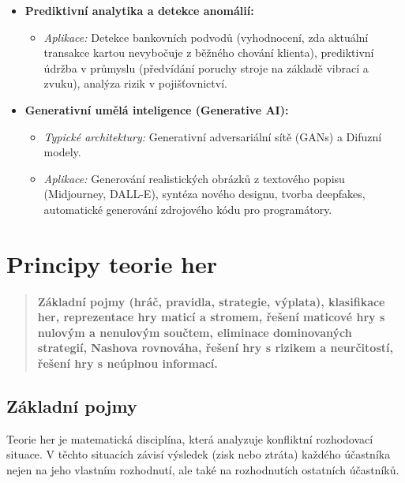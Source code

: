 \begin{itemize}
    \item \textbf{Prediktivní analytika a detekce anomálií:}
    \begin{itemize}
        \item \textit{Aplikace:} Detekce bankovních podvodů (vyhodnocení, zda aktuální transakce kartou nevybočuje z běžného chování klienta), prediktivní údržba v průmyslu (předvídání poruchy stroje na základě vibrací a zvuku), analýza rizik v pojišťovnictví.
    \end{itemize}
    
    \item \textbf{Generativní umělá inteligence (Generative AI):}
    \begin{itemize}
        \item \textit{Typické architektury:} Generativní adversariální sítě (GANs) a Difuzní modely.
        \item \textit{Aplikace:} Generování realistických obrázků z textového popisu (Midjourney, DALL-E), syntéza nového designu, tvorba deepfakes, automatické generování zdrojového kódu pro programátory.
    \end{itemize}
\end{itemize}

\section{Principy teorie her}
\begin{quote}
    \textbf{Základní pojmy (hráč, pravidla, strategie, výplata), klasifikace her, reprezentace hry maticí a stromem, řešení maticové hry s nulovým a nenulovým součtem, eliminace dominovaných strategií, Nashova rovnováha, řešení hry s rizikem a neurčitostí, řešení hry s neúplnou informací.}
\end{quote}

\subsection{Základní pojmy}
Teorie her je matematická disciplína, která analyzuje konfliktní rozhodovací situace. V těchto situacích závisí výsledek (zisk nebo ztráta) každého účastníka nejen na jeho vlastním rozhodnutí, ale také na rozhodnutích ostatních účastníků.

